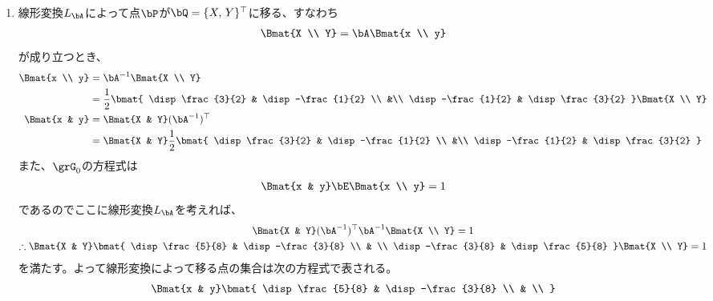 \begin{ans*}
\begin{enumerate}[label=(\arabic*)]
\begin{enumerate}[label=(\roman*)]
\begin{gather}
{        }
      \end{gather}
    \end{enumerate}
    \item
    線形変換$L_{\bA}$によって点$\bP$が$\bQ = \{X,\,Y\}^{\top}$に移る、すなわち
    \begin{gather}
      \Bmat{X \\ Y} = \bA\Bmat{x \\ y} \\
    \end{gather}
    が成り立つとき、
    \begin{align}
      \Bmat{x \\ y}
      &= \bA^{-1}\Bmat{X \\ Y} \\
      &= \frac{1}{2}\bmat{
        \disp\frac{3}{2} & \disp -\frac{1}{2} \\
        &\\
        \disp -\frac{1}{2} & \disp \frac{3}{2}
      }\Bmat{X \\ Y} \\
      \Bmat{x & y}
      &= \Bmat{X & Y}(\bA^{-1})^{\top} \\
      &= \Bmat{X & Y}\frac{1}{2}\bmat{
        \disp\frac{3}{2} & \disp -\frac{1}{2} \\
        &\\
        \disp -\frac{1}{2} & \disp \frac{3}{2}
      }
    \end{align}
    また、$\grG_{0}$の方程式は
    \begin{gather}
      \Bmat{x & y} \bE \Bmat{x \\ y} = 1
    \end{gather}
    であるのでここに線形変換$L_{\bA}$を考えれば、
    \begin{gather}
      \Bmat{X & Y} (\bA^{-1})^{\top} \bA^{-1} \Bmat{X \\ Y} = 1 \\
      \therefore
      \Bmat{X & Y} \bmat{
        \disp \frac{5}{8} & \disp -\frac{3}{8} \\
        & \\
        \disp -\frac{3}{8} & \disp \frac{5}{8}
      }\Bmat{X \\ Y} = 1
    \end{gather}
    を満たす。よって線形変換によって移る点の集合は次の方程式で表される。
    \begin{gather}
      \Bmat{x & y} \bmat{
        \disp \frac{5}{8} & \disp -\frac{3}{8} \\
        & \\
}
\end{gather}
\end{enumerate}
\end{ans*}
